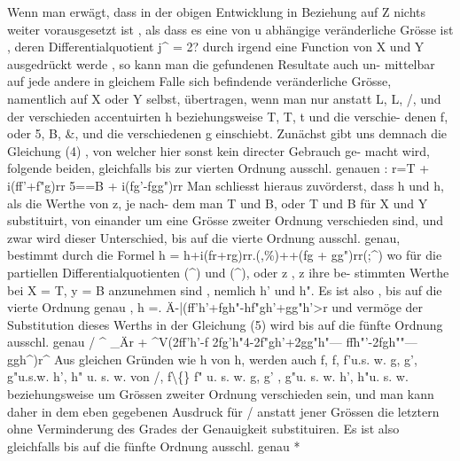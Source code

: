 \documentclass[12pt,a4paper]{article}
\begin{document}
Wenn  man  erwägt,  dass  in  der  obigen  Entwicklung  in  Beziehung  auf  Z nichts  weiter  vorausgesetzt  ist ,  als  dass  es  eine  von  u  abhängige  veränderliche Grösse  ist ,  deren  Differentialquotient  j\^{}  =  2?  durch  irgend  eine  Function  von X  und  Y  ausgedrückt  werde ,  so  kann  man  die  gefundenen  Resultate  auch  un- mittelbar auf  jede  andere  in  gleichem  Falle  sich  befindende  veränderliche  Grösse, namentlich  auf  X  oder  Y  selbst,  übertragen,  wenn  man  nur  anstatt  L,  L,  /, und  der  verschieden  accentuirten  h  beziehungsweise  T,  T,  t  und  die  verschie- denen f,  oder  5,  B,  \&,  und  die  verschiedenen  g  einschiebt.  Zunächst  gibt  uns demnach  die  Gleichung  (4) ,  von  welcher  hier  sonst  kein  directer  Gebrauch  ge- macht wird,  folgende  beiden,  gleichfalls  bis  zur  vierten  Ordnung  ausschl.  genauen : r=T  +  i(ff'+f"g)rr 5==B  +  i(fg'-fgg")rr Man  schliesst  hieraus  zuvörderst,  dass  h  und  h,  als  die  Werthe  von  z,  je  nach- dem man  T  und  B,  oder  T  und  B  für  X  und  Y  substituirt,  von  einander  um eine  Grösse  zweiter  Ordnung  verschieden  sind,  und  zwar  wird  dieser  Unterschied, bis  auf  die  vierte  Ordnung  ausschl.  genau,  bestimmt  durch  die  Formel h  =  h+i(fr+rg)rr.(,\%)++(fg  +  gg")rr(;\^{}) wo  für  die  partiellen  Differentialquotienten  (\^{})  und  (\^{}),  oder  z ,  z  ihre  be- stimmten Werthe  bei  X  =  T,  y  =  B  anzunehmen  sind ,  nemlich  h'  und  h". Es  ist  also ,  bis  auf  die  vierte  Ordnung  genau , h  =.  Ä-|(ff'h'+fgh"-hf"gh'+gg"h'>r und  vermöge  der  Substitution  dieses  Werths  in  der  Gleichung  (5)  wird  bis  auf die  fünfte  Ordnung  ausschl.  genau /  \^{}  \_Är  +  \^{}V(2ff'h'-f  2fg'h"4-2f"gh'+2gg"h"--- ffh"'-2fgh""--- ggh\^{})r\^{} Aus  gleichen  Gründen  wie  h  von  h,  werden  auch  f,  f,  f'u.s.  w.  g,  g',  g"u.s.w. h',  h"  u.  s.  w.  von  /,  f\textbackslash\{\}  f"  u.  s.  w.  g,  g' ,  g"u.  s.  w.  h',  h"u.  s.  w.  beziehungsweise um  Grössen  zweiter  Ordnung  verschieden  sein,  und  man  kann  daher  in  dem  eben gegebenen  Ausdruck  für  /  anstatt  jener  Grössen  die  letztern  ohne  Verminderung des  Grades  der  Genauigkeit  substituiren.  Es  ist  also  gleichfalls  bis  auf  die  fünfte Ordnung  ausschl.  genau *
\end{document}
